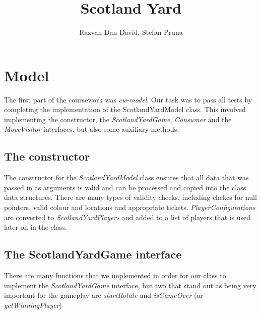 \documentclass[12pt,a4paper]{scrartcl}
\begin{document}
\title{Scotland Yard}
\author{Razvan Dan David, Stefan Pruna}
\maketitle

\section{Model}
The first part of the coursework was \textit{cw-model}. Our task was to pass all tests by completing the implementation of the ScotlandYardModel class. This involved implementing the constructor, the \textit{ScotlandYardGame}, \textit{Consumer} and the \textit{MoveVisitor} interfaces, but also some auxiliary methods.

\subsection*{The constructor}
The constructor for the \textit{ScotlandYardModel} class ensures that all data that was passed in as arguments is valid and can be processed and copied into the class data structures. There are many types of validity checks, including chekcs for null pointers, valid colour and locations and appropriate tickets. \textit{PlayerConfigurations} are converted to \textit{ScotlandYardPlayers} and added to a list of players that is used later on in the class.

\subsection*{The ScotlandYardGame interface}
There are many functions that we implemented in order for our class to implement the \textit{ScotlandYardGame} interface, but two that stand out as being very important for the gameplay are \textit{startRotate} and \textit{isGameOver} (or \textit{getWinningPlayer})
\end{document}
